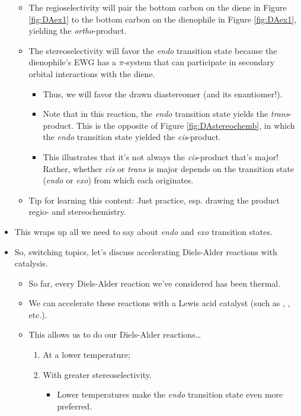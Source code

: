 \documentclass[../notes.tex]{subfiles}
\begin{document}
\begin{itemize}
\begin{itemize}
\begin{itemize}
        \end{itemize}
        \item The regioselectivity will pair the bottom carbon on the diene in Figure \ref{fig:DAex1} to the bottom carbon on the dienophile in Figure \ref{fig:DAex1}, yielding the \emph{ortho}-product.
        \item The stereoselectivity will favor the \emph{endo} transition state because the dienophile's EWG has a $\pi$-system that can participate in secondary orbital interactions with the diene.
        \begin{itemize}
            \item Thus, we will favor the drawn diastereomer (and its enantiomer!).
            \item Note that in this reaction, the \emph{endo} transition state yields the \emph{trans}-product. This is the opposite of Figure \ref{fig:DAstereochemb}, in which the \emph{endo} transition state yielded the \emph{cis}-product.
            \item This illustrates that it's not always the \emph{cis}-product that's major! Rather, whether \emph{cis} or \emph{trans} is major depends on the transition state (\emph{endo} or \emph{exo}) from which each originates.
        \end{itemize}
        \item Tip for learning this content: Just practice, esp. drawing the product regio- and stereochemistry.
    \end{itemize}
    \item This wraps up all we need to say about \emph{endo} and \emph{exo} transition states.
    \item So, switching topics, let's discuss accelerating Diels-Alder reactions with catalysis.
    \begin{itemize}
        \item So far, every Diels-Alder reaction we've considered has been thermal.
        \item We can accelerate these reactions with a Lewis acid catalyst (such as , , etc.).
        \item This allows us to do our Diels-Alder reactions\dots
        \begin{enumerate}
            \item At a lower temperature;
            \item With greater stereoselectivity.
            \begin{itemize}
                \item Lower temperatures make the \emph{endo} transition state even more preferred.

\end{itemize}
\end{enumerate}
\end{itemize}
\end{itemize}
\end{document}
